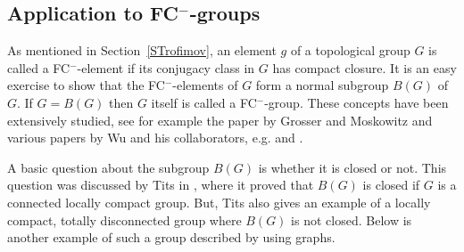 \documentclass{emsprocart}
\theoremstyle{definition}
\begin{document}
\subsection{Application to FC$^-$-groups}
As mentioned in Section~\ref{STrofimov}, an element $g$ of a topological
group $G$ is called a FC$^-$-element if its conjugacy class in $G$
has compact closure.  It is an easy exercise to show that the
FC$^-$-elements of $G$ form a normal subgroup $B(G)$ of $G$. If $G=B(G)$
then $G$ itself is called a FC$^-$-group.  These concepts have been
extensively studied, see for example the paper
\cite{GrosserMoskowitz1971} by Grosser and Moskowitz and various
papers by Wu and his collaborators, e.g. \cite{WuYu1972} and
\cite{Wu1991}.

A basic question about the subgroup $B(G)$ is whether it is closed or
not.  This question was discussed by Tits in \cite{Tits1964}, where it
proved that $B(G)$ is closed if $G$ is a connected locally compact
group.   But, Tits also gives an example of a locally compact, totally
disconnected group where $B(G)$ is not closed.    Below is another
example of such a group described by using graphs.

\medskip
\end{document}
